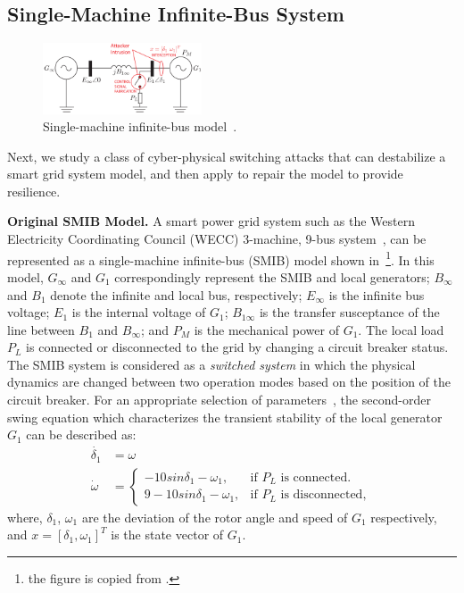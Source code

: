 \subsection{Single-Machine Infinite-Bus System}
%

\begin{figure}[t!]%
	\centering%
    \includegraphics[width=0.42\textwidth]{image/smib}%
	\caption{Single-machine infinite-bus model~\cite{farraj2014practical}.}%
\end{figure}%

Next, we study a class of cyber-physical switching attacks that can destabilize a smart grid system model, and then apply \toolreaffirm to repair the model to provide resilience. 

\vspace{0.5em}
\noindent
{\bf Original SMIB Model.}
A smart power grid system such as the Western Electricity Coordinating
Council (WECC) 3-machine, 9-bus system~\cite{sauer1998power}, can be represented as a single-machine infinite-bus (SMIB) model shown in~\footnote{the figure is copied from \cite{farraj2014practical}.}. In this model, $G_\infty$ and $G_1$ correspondingly represent the SMIB and local generators; $B_\infty$ and $B_1$ denote the infinite and local bus, respectively; $E_\infty$ is the infinite bus voltage; $E_1$ is the internal voltage of $G_1$; $B_{1\infty}$ is the transfer susceptance of the line between $B_1$ and $B_\infty$; and $P_M$ is the mechanical power of $G_1$. The local load $P_L$ is connected or disconnected to the grid by changing a circuit breaker status. 
%
The SMIB system is considered as a \emph{switched system} in which the physical dynamics are changed between two operation modes based on the position of the circuit breaker. 
%
%
For an appropriate selection of parameters~\cite{farraj2014practical}, the second-order swing equation which characterizes the transient stability of the local generator $G_1$ can be described as:
%
\begin{align}
\dot{\delta_1} & = \omega \nonumber \\
\dot{\omega} & = 
\begin{cases}
    -10sin\delta_1 - \omega_1, & \text{if $P_L$ is connected}.\\
    9 - 10sin\delta_1 - \omega_1, & \text{if $P_L$ is disconnected},
 \end{cases} \label{eq:smib_dynamics}
\end{align}
%
where, $\delta_1$, $\omega_1$ are the deviation of the rotor angle and speed of $G_1$ respectively, and $x = [\delta_1,\omega_1]^T$ is the state vector of $G_1$.
%
%

